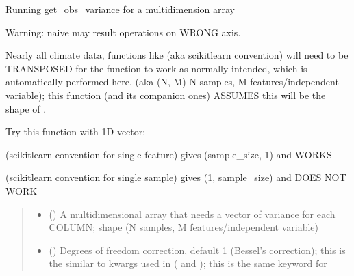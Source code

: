 \documentclass[letterpaper,10pt,english]{sphinxmanual}
\begin{document}
\begin{fulllineitems}
\label{\detokenize{kalman:glomar_gridding.autocorrelation.compute_autocorrelation.get_obs_variance_vectorize}}
\pysigstartsignatures
\pysiglinewithargsret
{}
{\sphinxparamcomma {}\sphinxparamcomma {}}
{}
\pysigstopsignatures
\sphinxAtStartPar
Running get\_obs\_variance for a multi\sphinxhyphen{}dimension array

\sphinxAtStartPar
Warning: naive  may result operations on WRONG axis.

\sphinxAtStartPar
Nearly all climate data, functions like 
(aka scikit\sphinxhyphen{}learn convention) will need to be TRANSPOSED for the function
to work as normally intended, which is automatically performed here.
(aka (N, M) \textendash{} N samples, M features/independent variable); this function
(and its companion ones) ASSUMES this will be the shape of .

\sphinxAtStartPar
Try this function with 1D vector:

\sphinxAtStartPar
{}
(scikit\sphinxhyphen{}learn convention for single feature)
gives (sample\_size, 1) and WORKS

\sphinxAtStartPar
{}
(scikit\sphinxhyphen{}learn convention for single sample)
gives (1, sample\_size) and DOES NOT WORK
\begin{quote}\begin{description}
\begin{itemize}
\item {}
\sphinxAtStartPar
{} () \textendash{} A multidimensional array that needs a vector of variance for
each COLUMN;
shape  (N samples, M features/independent variable)

\item {}
\sphinxAtStartPar
{} () \textendash{} Degrees of freedom correction, default 1 (Bessel’s correction);
this is the similar to kwargs used in  ( and
); this is the same keyword for 


\end{itemize}
\end{description}
\end{quote}
\end{fulllineitems}
\end{document}
